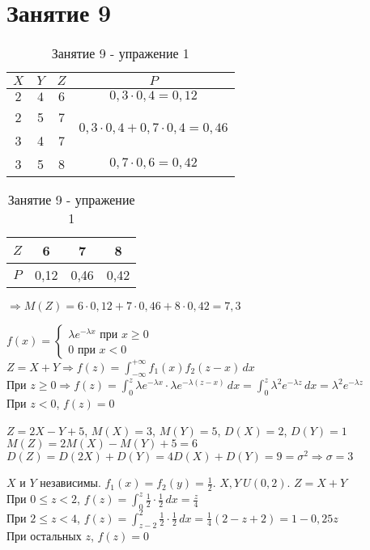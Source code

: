 \section*{Занятие 9}
\begin{exercise}[1]
	\begin{table}
		\centering
		\begin{tabular}{|c|c|c|c|}
			\hline
			$X$ & $Y$ & $Z$ & $P$ \\ \hline
			$2$ & $4$ & $6$ & $0,3 \cdot 0,4 = 0,12$ \\ \hline
			2 & 5 & 7 & \multirow{2}{*}{$0,3 \cdot 0,4 + 0,7 \cdot 0,4 = 0,46$} \\ \cline{1-3}
			3 & 4 & 7 & \\ \hline
			3 & 5 & 8 & $0,7 \cdot 0,6 = 0,42$ \\ \hline 
		\end{tabular}
		\begin{tabular}{|c|ccc|}
			\hline
			$Z$ & 6 & 7 & 8 \\ \hline
			$P$ & 0,12 & 0,46 & 0,42 \\ \hline
		\end{tabular}
	\caption{Занятие 9 - упражение 1}
	\end{table}
	$\Rightarrow M(Z) = 6 \cdot 0,12 + 7 \cdot 0,46 + 8 \cdot 0,42 = 7,3$
\end{exercise}

\begin{exercise}[2]
	$f(x) = \begin{cases}
		\lambda e^{-\lambda x} \text{ при } x \geq 0 \\
		0 \text{ при } x < 0
	\end{cases}$ \\
	$Z = X+Y \Rightarrow f(z) = \int_{-\infty}^{+\infty}f_1(x) f_2(z-x)\,dx$ \\
	При $z \geq 0 \Rightarrow f(z) = \int_{0}^{z}\lambda e^{-\lambda x} \cdot \lambda e^{-\lambda (z-x)}\,dx = \int_{0}^{z}\lambda^2 e^{-\lambda z}\,dx = \lambda^2 e^{-\lambda z}$ \\
	При $z < 0$, $f(z)=0$
\end{exercise}

\begin{exercise}[3]
	$Z=2X-Y+5$, $M(X)=3$, $M(Y)=5$, $D(X)=2$, $D(Y)=1$ \\
	$M(Z)=2M(X)-M(Y)+5=6$ \\
	$D(Z)=D(2X)+D(Y)=4D(X)+D(Y)=9=\sigma^2 \Rightarrow \sigma=3$
\end{exercise}

\begin{exercise}[4]
	$X$ и $Y$ независимы. $f_1(x) = f_2(y) = \frac{1}{2}$. $X, Y ~ U(0, 2)$. $Z=X+Y$ \\
	При $0 \leq z < 2$, $f(z) = \int_{0}^{z}\frac{1}{2} \cdot \frac{1}{2}\,dx = \frac{z}{4}$ \\
	При $2 \leq z < 4$, $f(z) = \int_{z-2}^{2}\frac{1}{2} \cdot \frac{1}{2}\,dx = \frac{1}{4}(2-z+2) = 1-0,25z$ \\
	При остальных $z$, $f(z)=0$
\end{exercise}

